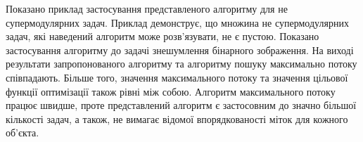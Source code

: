 \chapterConclusion

Показано приклад застосування представленого алгоритму для
не супермодулярних задач. Приклад демонструє, що множина
не супермодулярних задач, які наведений
алгоритм може розв’язувати, не є пустою.
Показано застосування алгоритму до задачі знешумлення бінарного
зображення. На виході результати запропонованого алгоритму та
алгоритму пошуку максимально потоку співпадають. Більше того, значення
максимального потоку та значення цільової функції оптимізації також рівні між собою.
Алгоритм максимального потоку працює швидше, проте представлений
алгоритм є застосовним до значно більшої кількості задач, а також, не вимагає
відомої впорядкованості міток для кожного об'єкта.